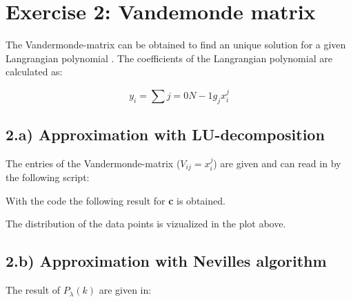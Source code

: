 \section{Exercise 2: Vandemonde matrix}

The Vandermonde-matrix can be obtained to find an unique solution for a given  Langrangian polynomial .
The coefficients of the Langrangian polynomial are calculated as:

\begin{equation}
	y_i = \sum{j=0}{N-1} g_j x_i^j
\end{equation}

\subsection{2.a) Approximation with LU-decomposition}

The entries of the Vandermonde-matrix ($V_{ij} = x_i^j$) are given and can read in by the following script:
 


With the code the following result for \textbf{c} is obtained.



The distribution of the data points is vizualized in the plot above.

\subsection{2.b) Approximation with Nevilles algorithm}

The result of $P_{\lambda}(k)$ are given in:


